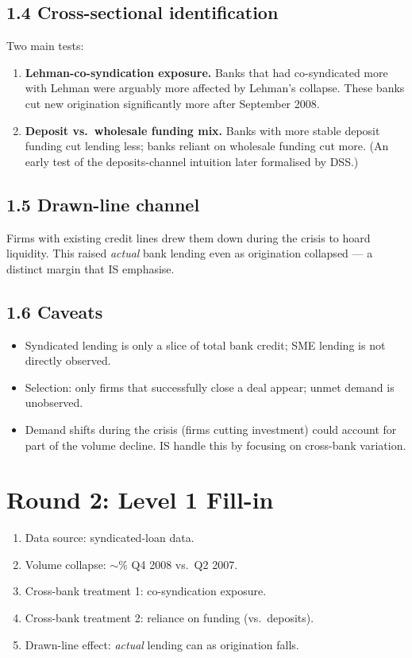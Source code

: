 \documentclass[11pt]{article}
\newcommand{\blank}[1]{\underline{\hspace{#1}}}
\begin{document}
\subsection*{1.4 Cross-sectional identification}
Two main tests:
\begin{enumerate}
\item \textbf{Lehman-co-syndication exposure.} Banks that had co-syndicated more with Lehman were arguably more affected by Lehman's collapse. These banks cut new origination significantly more after September 2008.
\item \textbf{Deposit vs.\ wholesale funding mix.} Banks with more stable deposit funding cut lending less; banks reliant on wholesale funding cut more. (An early test of the deposits-channel intuition later formalised by DSS.)
\end{enumerate}

\subsection*{1.5 Drawn-line channel}
Firms with existing credit lines drew them down during the crisis to hoard liquidity. This raised \emph{actual} bank lending even as origination collapsed --- a distinct margin that IS emphasise.

\subsection*{1.6 Caveats}
\begin{alertbox}
\begin{itemize}
\item Syndicated lending is only a slice of total bank credit; SME lending is not directly observed.
\item Selection: only firms that successfully close a deal appear; unmet demand is unobserved.
\item Demand shifts during the crisis (firms cutting investment) could account for part of the volume decline. IS handle this by focusing on cross-bank variation.
\end{itemize}
\end{alertbox}

\section*{Round 2: Level 1 Fill-in}
\begin{enumerate}
\item Data source: \blank{2cm} syndicated-loan data.
\item Volume collapse: $\sim$\blank{1cm}\% Q4 2008 vs.\ Q2 2007.
\item Cross-bank treatment 1: \blank{2cm} co-syndication exposure.
\item Cross-bank treatment 2: reliance on \blank{2cm} funding (vs.\ deposits).
\item Drawn-line effect: \emph{actual} lending can \blank{1cm} as origination falls.
\end{enumerate}
\end{document}
